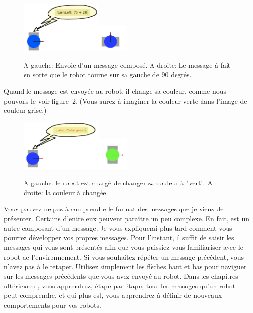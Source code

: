 \documentclass[a4paper,10pt,twoside]{book}
\begin{document}
\begin{figure}[h]\begin{center}{\hfill\includegraphics[width=4cm]{10-turn20+702}\hfill\includegraphics[width=1.6cm]{11-turned2}\hfill}\end{center}
\caption{A gauche: Envoie d'un message compos\'e. A droite: Le message \`a fait en sorte que le robot tourne sur sa gauche de 90 degr\'es.\label{fig:turned}}
\end{figure}

Quand le message  est envoy\'ee au robot, il change sa couleur, comme nous pouvons le voir figure~\ref{fig:green}. (Vous aurez \`a imaginer la couleur verte dans l'image de couleur grise.)


\begin{figure}[!h]\centerline{\hfill\includegraphics[width=4cm]{12-colorGreen2}\hfill\includegraphics[width=1.6cm]{13-green2}\hfill}
\caption{A gauche: le robot est charg\'e de changer sa couleur \`a "vert". A droite: la couleur \`a chang\'ee.\label{fig:green}}
\end{figure}


Vous pouvez ne pas \`a comprendre le format des messages que je viens de pr\'esenter. Certains d'entre eux peuvent para\^itre un peu complexe. En fait,   est un autre composant d'un message. Je vous expliquerai plus tard comment vous pourrez d\'evelopper vos propres messages. Pour l'instant, il suffit de saisir les messages qui vous sont pr\'esent\'es afin que vous puissiez vous familiariser avec le robot de l'environnement. Si vous souhaitez r\'ep\'eter un message pr\'ec\'edent, vous n'avez pas \`a le retaper. Utilisez simplement les fl\`eches haut et bas pour naviguer sur les messages pr\'ec\'edents que vous avez envoy\'e au robot. Dans les chapitres ult\'erieures , vous apprendrez, \'etape par \'etape, tous les messages qu'un robot peut comprendre, et qui plus est, vous apprendrez \`a d\'efinir de nouveaux comportements pour vos robots. 
\end{document}
